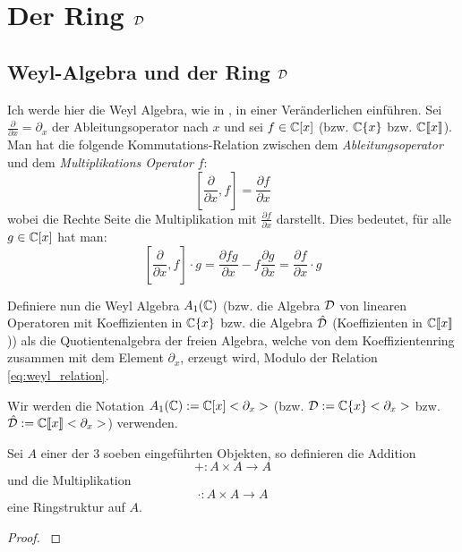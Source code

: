 
\chapter{Der Ring $\mathcal{D}$}

\section{Weyl-Algebra und der Ring $\mathcal{D}$} 
Ich werde hier die Weyl Algebra, wie in
\cite[Chapter~1]{sabbah_cimpa90}, in einer Veränderlichen einführen.
Sei $\frac{\partial}{\partial x}=\partial_x$ der Ableitungsoperator nach $x$
und sei $f \in\mathbb{C}[x]$ (bzw. $\mathbb{C}\{x\}$ bzw. $\mathbb{C}\llbracket x\rrbracket$).
Man hat die folgende Kommutations-Relation zwischen dem
\emph{Ableitungsoperator}
und dem \emph{Multiplikations Operator} $f$:
\begin{equation}\label{eq:weyl_relation}
  [\frac{\partial}{\partial x},f]=\frac{\partial f}{\partial x}
\end{equation}
wobei die Rechte Seite die Multiplikation mit $\frac{\partial f}{\partial x}$
darstellt. Dies bedeutet, für alle $g\in\mathbb{C}[x]$ hat man:
\[
  [\frac{\partial}{\partial x},f]\cdot g
  =\frac{\partial fg}{\partial x} - f\frac{\partial g}{\partial x}
  =\frac{\partial f}{\partial x} \cdot g
\]
\begin{defn}
  Definiere nun die Weyl Algebra $A_1(\mathbb{C})$ (bzw. die Algebra $\mathcal{D}$ von
  linearen Operatoren mit Koeffizienten in $\mathbb{C}\{x\}$ bzw. die Algebra
  $\hat{\mathcal{D}}$ (Koeffizienten in $\mathbb{C}\llbracket x\rrbracket$)) als die
  Quotientenalgebra der freien Algebra, welche von dem Koeffizientenring
  zusammen mit dem Element $\partial_x$, erzeugt wird, Modulo der Relation
  \eqref{eq:weyl_relation}.
\end{defn}
Wir werden die Notation $A_1(\mathbb{C}):=\mathbb{C}[x]<\partial_x>$ (bzw.
$\mathcal{D}:=\mathbb{C}\{x\}<\partial_x>$ bzw. 
$\hat{\mathcal{D}}:=\mathbb{C}\llbracket x\rrbracket<\partial_x>$) verwenden.

\begin{comment}
Beispiele und Alternative Definition:\\
Sergey-Arkhipov-MAT1191\_Lecture\_Notes.pdf Chapter 2.1
\end{comment}

\begin{lem} %
  Sei $A$ einer der 3 soeben eingeführten Objekten, so definieren die Addition 
  \[
    +:A\times A \rightarrow A
  \]
  und die Multiplikation
  \[
    \cdot:A\times A \rightarrow A
  \]
  eine Ringstruktur auf $A$.
\end{lem}
\begin{proof}
  \cite[Kapittel 2 Section 1]{ZulaBarbara}
\end{proof}

